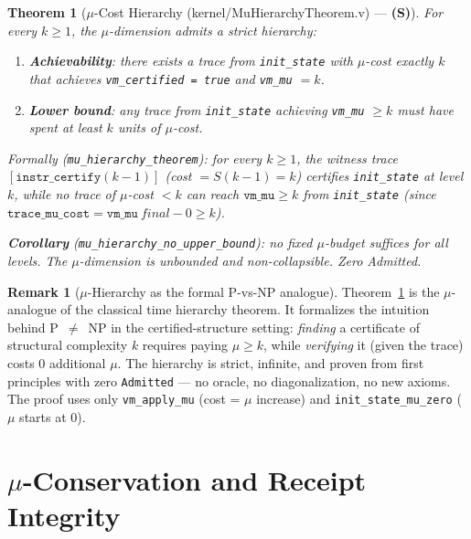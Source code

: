 \documentclass[11pt, a4paper]{report}
\theoremstyle{definition}
\newtheorem{remark}{Remark}[chapter]
\theoremstyle{plain}
\newtheorem{theorem}{Theorem}[chapter]
\begin{document}
\begin{theorem}[$\mu$-Cost Hierarchy {\normalfont (kernel/MuHierarchyTheorem.v)} --- \textbf{(S)}]
\label{thm:mu-hierarchy}
For every $k \geq 1$, the $\mu$-dimension admits a strict hierarchy:
\begin{enumerate}
  \item \textbf{Achievability}: there exists a trace from \texttt{init\_state} with $\mu$-cost exactly $k$ that achieves \texttt{vm\_certified = true} and \texttt{vm\_mu} $= k$.
  \item \textbf{Lower bound}: any trace from \texttt{init\_state} achieving \texttt{vm\_mu} $\geq k$ must have spent at least $k$ units of $\mu$-cost.
\end{enumerate}
Formally (\texttt{mu\_hierarchy\_theorem}): for every $k \geq 1$, the witness trace $[\texttt{instr\_certify}(k{-}1)]$ (cost $= S(k{-}1) = k$) certifies \texttt{init\_state} at level $k$, while no trace of $\mu$-cost $< k$ can reach $\texttt{vm\_mu} \geq k$ from \texttt{init\_state} (since $\texttt{trace\_mu\_cost} = \texttt{vm\_mu}~\textit{final} - 0 \geq k$).

\textbf{Corollary} (\texttt{mu\_hierarchy\_no\_upper\_bound}): no fixed $\mu$-budget suffices for all levels. The $\mu$-dimension is unbounded and non-collapsible. Zero Admitted.
\end{theorem}

\begin{remark}[$\mu$-Hierarchy as the formal P-vs-NP analogue]
Theorem~\ref{thm:mu-hierarchy} is the $\mu$-analogue of the classical time hierarchy theorem. It formalizes the intuition behind P~$\neq$~NP in the certified-structure setting: \emph{finding} a certificate of structural complexity $k$ requires paying $\mu \geq k$, while \emph{verifying} it (given the trace) costs 0 additional $\mu$. The hierarchy is strict, infinite, and proven from first principles with zero \texttt{Admitted} — no oracle, no diagonalization, no new axioms. The proof uses only \texttt{vm\_apply\_mu} (cost = $\mu$ increase) and \texttt{init\_state\_mu\_zero} ($\mu$ starts at 0).
\end{remark}


\chapter{$\mu$-Conservation and Receipt Integrity}
\end{document}

